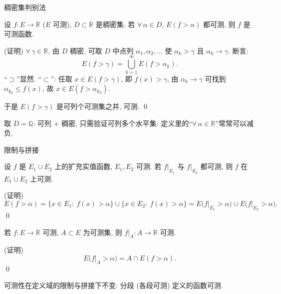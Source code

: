 \begin{frame}{稠密集判别法}

\begin{thm}[稠密集判别法]
设 $f: E \to \mathbb{R}$ ($E$ 可测), $D \subset \mathbb{R}$ 是\alert{稠密集}. 若 $\forall\, \alpha \in D$, $E(f > \alpha)$ 都可测, 则 $f$ 是可测函数.
\end{thm}

\startproof[bg=yellow, fg=red](证明)
$\forall\, \gamma \in \mathbb{R}$, 由 $D$ 稠密, 可取 $D$ 中点列 $\alpha_1, \alpha_2, \ldots$ 使 $\alpha_k > \gamma$ 且 $\alpha_k \to \gamma$. 断言:
\[
E(f > \gamma) = \bigcup_{k=1}^{\infty} E(f > \alpha_k).
\]
``$\supset$''显然. ``$\subset$'': 任取 $x \in E(f>\gamma)$, 即 $f(x) > \gamma$, 由 $\alpha_k \to \gamma$ 可找到 $\alpha_{k_0} \leqslant f(x)$, 故 $x \in E(f > \alpha_{k_0})$.

于是 $E(f>\gamma)$ 是可列个可测集之并, 可测.
\qed

\pause

\begin{remark}
取 $D = \mathbb{Q}$: 可列 $+$ 稠密, 只需验证\alert{可列多个}水平集: 定义里的``$\forall\, \alpha \in \mathbb{R}$''常常可以减负.
\end{remark}

\end{frame}


\begin{frame}{限制与拼接}

\begin{thm}[拼接]
设 $f$ 是 $E_1 \cup E_2$ 上的扩充实值函数, $E_1, E_2$ 可测. 若 $f\big|_{E_1}$ 与 $f\big|_{E_2}$ 都可测, 则 $f$ 在 $E_1 \cup E_2$ 上可测.
\end{thm}

\startproof[bg=yellow, fg=red](证明)
\[
E(f > \alpha) = \{x \in E_1:\ f(x) > \alpha\} \cup \{x \in E_2:\ f(x) > \alpha\}
= E\big(f\big|_{E_1} > \alpha\big) \cup E\big(f\big|_{E_2} > \alpha\big).
\]
\qed

\pause

\begin{thm}[限制]
若 $f: E \to \mathbb{R}$ 可测, $A \subset E$ 为可测集, 则 $f\big|_A: A \to \mathbb{R}$ 可测.
\end{thm}

\startproof[bg=yellow, fg=red](证明)
\[
E\big(f\big|_A > \alpha\big) = A \cap E(f > \alpha).
\]
\qed

\pause

\begin{remark}
可测性在定义域的\alert{限制}与\alert{拼接}下不变: 分段 (各段可测) 定义的函数可测.
\end{remark}

\end{frame}

